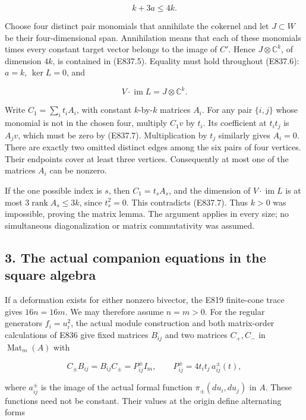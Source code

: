 \[
 k+3a\le4k.
 \tag{E837.6}
\]

Choose four distinct pair monomials that annihilate the cokernel and let
\(J\subset W\) be their four-dimensional span. Annihilation means that
each of these monomials times every constant target vector belongs to
the image of \(C'\). Hence \(J\otimes\mathbb C^k\), of dimension \(4k\),
is contained in (E837.5). Equality must hold throughout (E837.6):
\(a=k\), \(\ker L=0\), and

\[
 V\cdot\operatorname{im}L=J\otimes\mathbb C^k.
 \tag{E837.7}
\]

Write \(C_1=\sum_i t_i A_i\), with constant \(k\)-by-\(k\) matrices
\(A_i\). For any pair \(\{i,j\}\) whose monomial is not in the chosen
four, multiply \(C_1v\) by \(t_i\). Its coefficient at \(t_it_j\) is
\(A_jv\), which must be zero by (E837.7). Multiplication by \(t_j\)
similarly gives \(A_i=0\). There are exactly two omitted distinct edges
among the six pairs of four vertices. Their endpoints cover at least
three vertices. Consequently at most one of the matrices \(A_i\) can be
nonzero.

If the one possible index is \(s\), then \(C_1=t_sA_s\), and the
dimension of \(V\cdot\operatorname{im}L\) is at most
\(3\operatorname{rank}A_s\le3k\), since \(t_s^2=0\). This contradicts
(E837.7). Thus \(k>0\) was impossible, proving the matrix lemma. The
argument applies in every size; no simultaneous diagonalization or
matrix commutativity was assumed.

\subsection{3. The actual companion equations in the square
algebra}\label{the-actual-companion-equations-in-the-square-algebra}

If a deformation exists for either nonzero bivector, the E819
finite-cone trace gives \(16n=16m\). We may therefore assume \(n=m>0\).
For the regular generators \(f_i=u_i^2\), the actual module construction
and both matrix-order calculations of E836 give fixed matrices
\(B_{ij}\) and two matrices \(C_+,C_-\) in \(\operatorname{Mat}_m(A)\)
with

\[
 C_\pm B_{ij}=B_{ij}C_\pm=P^\pm_{ij}I_m,
 \qquad
 P^\pm_{ij}=4t_it_j\,a^\pm_{ij}(t),
 \tag{E837.8}
\]

where \(a^\pm_{ij}\) is the image of the actual formal function
\(\pi_\pm(du_i,du_j)\) in \(A\). These functions need not be constant.
Their values at the origin define alternating forms

